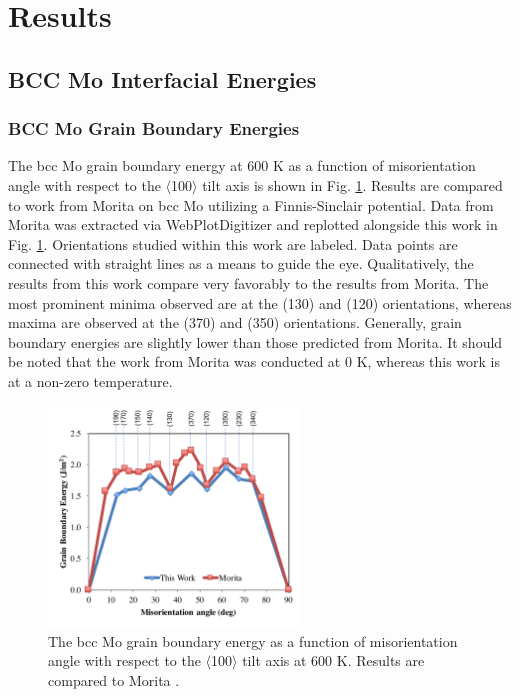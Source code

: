 \documentclass[review]{elsarticle}
\begin{document}
\section{Results}
\subsection{BCC Mo Interfacial Energies}

\subsubsection{BCC Mo Grain Boundary Energies}

The bcc Mo grain boundary energy at 600 K as a function of misorientation angle with respect to the $\langle$100$\rangle$ tilt axis is shown in Fig. \ref{fig:mo600}. Results are compared to work from Morita \cite{morita1997} on bcc Mo utilizing a Finnis-Sinclair \cite{finnis} potential. Data from Morita \cite{morita1997} was extracted via WebPlotDigitizer \cite{webplot} and replotted alongside this work in Fig. \ref{fig:mo600}. Orientations studied within this work are labeled. Data points are connected with straight lines as a means to guide the eye. Qualitatively, the results from this work compare very favorably to the results from Morita. The most prominent minima observed are at the (130) and (120) orientations, whereas maxima are observed at the (370) and (350) orientations. Generally, grain boundary energies are slightly lower than those predicted from Morita. It should be noted that the work from Morita was conducted at 0 K, whereas this work is at a non-zero temperature. 

\begin{figure}[h]
 \centering
 \includegraphics[width=0.6\textwidth]{mo600A.png} 
 \caption{The bcc Mo grain boundary energy as a function of misorientation angle with respect to the $\langle$100$\rangle$ tilt axis at 600 K. Results are compared to Morita \cite{morita1997}.}
 \label{fig:mo600}
\end{figure}
\end{document}
